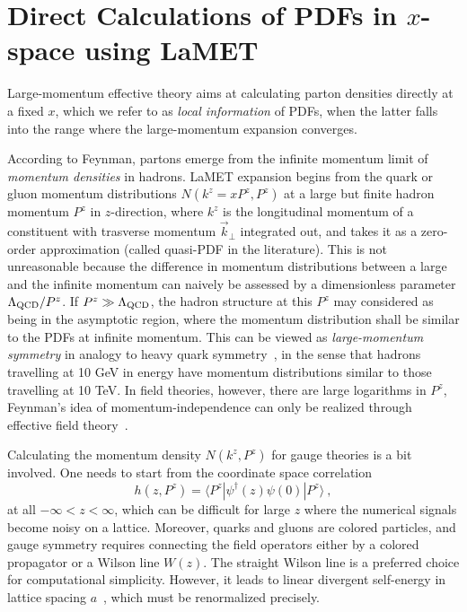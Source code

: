 \documentclass[prd,aps,twocolumn,preprintnumbers,showpacs,nofootinbib,superscriptaddress,notitlepage]{revtex4-2}
\begin{document}
\section{Direct Calculations
of PDFs in $x$-space using LaMET}

Large-momentum effective theory aims at calculating parton densities directly at a 
fixed $x$, which we refer to as {\it local information} of PDFs, when the latter falls into the range where the large-momentum expansion converges.

According to Feynman, partons emerge from the infinite momentum limit of {\it momentum densities} in hadrons. LaMET expansion begins from the quark or gluon momentum distributions $N(k^z=xP^z,P^z)$  at a large but finite hadron momentum $P^z$ in $z$-direction, where $k^z$ is the longitudinal momentum of a constituent with trasverse momentum $\vec{k}_\perp$ integrated out, and takes it as a zero-order approximation (called quasi-PDF in the literature). This is not unreasonable because the difference in momentum distributions between a large and the infinite momentum can naively be assessed by a dimensionless parameter $\Lambda_{\rm QCD}/P^z$. If $P^z\gg \Lambda_{\rm QCD}$, the hadron structure at this $P^z$ may considered as being in the asymptotic region, where the momentum distribution shall be similar to the PDFs at infinite momentum. This can be viewed as {\it large-momentum symmetry} in analogy to heavy quark symmetry~\cite{Georgi:1990um}, in the sense that hadrons travelling at 10 GeV in energy have momentum distributions similar to those travelling at 10 TeV. In field theories, however, there are large logarithms in $P^z$, Feynman's idea of momentum-independence can only be realized through effective field theory~\cite{Ji:2014gla}.

Calculating the momentum density $N(k^z, P^z)$
for gauge theories is a bit involved. One needs to start from the coordinate 
space correlation
\begin{equation}
   h(z, P^z)= \langle P^z| \psi^\dagger(z)\psi(0)|P^z\rangle \ , 
\end{equation}
at all $-\infty<z<\infty$, which can be  difficult for large $z$ where the numerical signals become noisy on a lattice. Moreover, quarks and gluons are colored particles, and gauge symmetry requires connecting the field operators either by a colored propagator or a Wilson line $W(z)$. The straight Wilson line is a preferred choice
for computational simplicity. However, it leads to linear divergent self-energy in lattice spacing $a$~\cite{Ji:2017oey,Green:2017xeu,Ishikawa:2017faj}, which must be renormalized precisely. 
\end{document}
